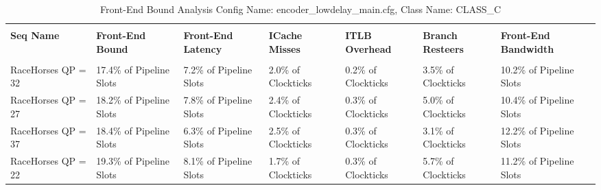 \documentclass{article}%
\begin{document}
\begin{longtabu}{| X[l] | X[l] | X[l] | X[l] | X[l] | X[l] | X[l] |}%
\caption{%
Front{-}End Bound Analysis\newline%
 Config Name: encoder\_lowdelay\_main.cfg,\newline%
 Class Name: CLASS\_C\newline%
%
}%
\hline%
&&&&&&\\%
\textbf{Seq Name}&\textbf{Front{-}End Bound}&\textbf{Front{-}End Latency}&\textbf{ICache Misses}&\textbf{ITLB Overhead}&\textbf{Branch Resteers}&\textbf{Front{-}End Bandwidth}\\%
&&&&&&\\%
\hline%
\endhead%
RaceHorses\newline%
 QP = 32&17.4\% of Pipeline Slots&7.2\% of Pipeline Slots&2.0\% of Clockticks&0.2\% of Clockticks&3.5\% of Clockticks&10.2\% of Pipeline Slots\\%
\hline%
RaceHorses\newline%
 QP = 27&18.2\% of Pipeline Slots&7.8\% of Pipeline Slots&2.4\% of Clockticks&0.3\% of Clockticks&5.0\% of Clockticks&10.4\% of Pipeline Slots\\%
\hline%
RaceHorses\newline%
 QP = 37&18.4\% of Pipeline Slots&6.3\% of Pipeline Slots&2.5\% of Clockticks&0.3\% of Clockticks&3.1\% of Clockticks&12.2\% of Pipeline Slots\\%
\hline%
RaceHorses\newline%
 QP = 22&19.3\% of Pipeline Slots&8.1\% of Pipeline Slots&1.7\% of Clockticks&0.3\% of Clockticks&5.7\% of Clockticks&11.2\% of Pipeline Slots\\%
\hline%
\end{longtabu}%
\newpage%
\end{document}
